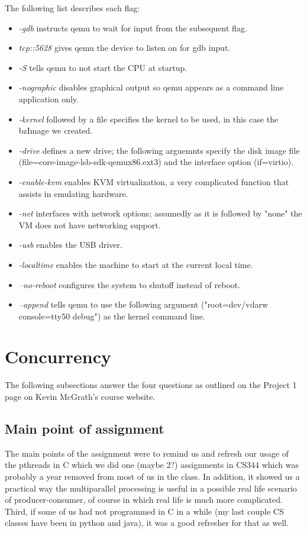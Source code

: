 \documentclass[letterpaper,10pt,titlepage]{article}
\begin{document}
The following list describes each flag:
\begin{itemize}
\item \emph{-gdb} instructs qemu to wait for input from the subsequent flag.
\item \emph{tcp::5628} gives qemu the device to listen on for gdb input.
\item \emph{-S} tells qemu to not start the CPU at startup.
\item \emph{-nographic} disables graphical output so qemu appears as a command line application only.
\item \emph{-kernel} followed by a file specifies the kernel to be used, in this case the bzImage we created.
\item \emph{-drive} defines a new drive; the following arguemnts specify the disk image file (file=core-image-lsb-sdk-qemux86.ext3) and the interface option (if=virtio).
\item \emph{-enable-kvm} enables KVM virtualization, a very complicated function that assists in emulating hardware.
\item \emph{-net} interfaces with network options; assumedly as it is followed by "none" the VM does not have networking support. 
\item \emph{-usb} enables the USB driver.
\item \emph{-localtime} enables the machine to start at the current local time.
\item \emph{--no-reboot} configures the system to shutoff instead of reboot.
\item \emph{--append} tells qemu to use the following argument ("root=dev/vdarw console=tty50 debug") as the kernel command line.
\end{itemize}

\section{Concurrency}
The following subsections answer the four questions as outlined on the Project 1 page on Kevin McGrath's course website.
\subsection{Main point of assignment}
The main points of the assignment were to remind us and refresh our usage of the pthreads in C which we did one (maybe 2?) assignments in CS344 which was probably a year removed from most of us in the class. In addition, it showed us a practical way the multiparallel processing is useful in a possible real life scenario of producer-consumer, of course in which real life is much more complicated.  Third, if some of us had not programmed in C in a while (my last couple CS classes have been in python and java), it was a good refresher for that as well.
\end{document}
